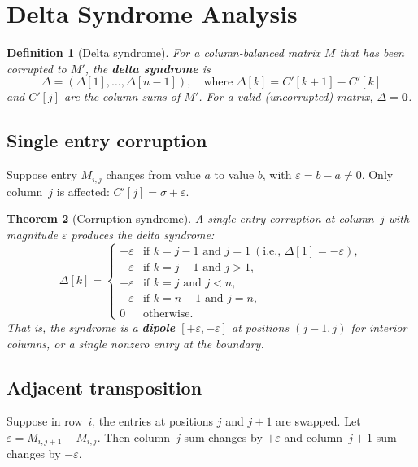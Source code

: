 \documentclass[11pt]{article}
\newtheorem{theorem}{Theorem}
\newtheorem{definition}[theorem]{Definition}
\begin{document}
\section{Delta Syndrome Analysis}
\label{sec:syndrome}

\begin{definition}[Delta syndrome]
For a column-balanced matrix $M$ that has been corrupted to $M'$, the \textbf{delta syndrome} is
\[
\Delta = (\Delta[1], \dots, \Delta[n-1]), \quad \text{where } \Delta[k] = C'[k+1] - C'[k]
\]
and $C'[j]$ are the column sums of $M'$. For a valid (uncorrupted) matrix, $\Delta = \mathbf{0}$.
\end{definition}

\subsection{Single entry corruption}

Suppose entry $M_{i,j}$ changes from value $a$ to value $b$, with $\varepsilon = b - a \neq 0$. Only column~$j$ is affected: $C'[j] = \sigma + \varepsilon$.

\begin{theorem}[Corruption syndrome]\label{thm:corruption}
A single entry corruption at column~$j$ with magnitude $\varepsilon$ produces the delta syndrome:
\[
\Delta[k] = \begin{cases}
-\varepsilon & \text{if } k = j-1 \text{ and } j = 1\ (\text{i.e., } \Delta[1] = -\varepsilon), \\
+\varepsilon & \text{if } k = j-1 \text{ and } j > 1, \\
-\varepsilon & \text{if } k = j \text{ and } j < n, \\
+\varepsilon & \text{if } k = n-1 \text{ and } j = n, \\
0 & \text{otherwise.}
\end{cases}
\]
That is, the syndrome is a \textbf{dipole} $[+\varepsilon, -\varepsilon]$ at positions $(j-1, j)$ for interior columns, or a single nonzero entry at the boundary.
\end{theorem}

\subsection{Adjacent transposition}

Suppose in row~$i$, the entries at positions $j$ and $j+1$ are swapped. Let $\varepsilon = M_{i,j+1} - M_{i,j}$. Then column~$j$ sum changes by $+\varepsilon$ and column~$j+1$ sum changes by $-\varepsilon$.
\end{document}

